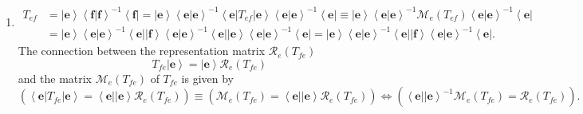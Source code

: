 \documentclass[aps,preprint]{revtex4}%
\begin{document}
\begin{enumerate}
\item
\begin{align}
T_{ef}  &  =\left\vert \mathbf{e}\right\rangle \left\langle \left.
\mathbf{f}\right\vert \mathbf{f}\right\rangle ^{-1}\left\langle \mathbf{f}%
\right\vert =\left\vert \mathbf{e}\right\rangle \left\langle \left.
\mathbf{e}\right\vert \mathbf{e}\right\rangle ^{-1}\left\langle \mathbf{e}%
\right\vert T_{ef}\left\vert \mathbf{e}\right\rangle \left\langle \left.
\mathbf{e}\right\vert \mathbf{e}\right\rangle ^{-1}\left\langle \mathbf{e}%
\right\vert \equiv\left\vert \mathbf{e}\right\rangle \left\langle \left.
\mathbf{e}\right\vert \mathbf{e}\right\rangle ^{-1}\mathcal{M}_{e}\left(
T_{ef}\right)  \left\langle \left.  \mathbf{e}\right\vert \mathbf{e}%
\right\rangle ^{-1}\left\langle \mathbf{e}\right\vert \\
&  =\left\vert \mathbf{e}\right\rangle \left\langle \left.  \mathbf{e}%
\right\vert \mathbf{e}\right\rangle ^{-1}\left\langle \mathbf{e}\right\vert
\left\vert \mathbf{f}\right\rangle \left\langle \left.  \mathbf{e}\right\vert
\mathbf{e}\right\rangle ^{-1}\left\langle \mathbf{e}\right\vert \left\vert
\mathbf{e}\right\rangle \left\langle \left.  \mathbf{e}\right\vert
\mathbf{e}\right\rangle ^{-1}\left\langle \mathbf{e}\right\vert =\left\vert
\mathbf{e}\right\rangle \left\langle \left.  \mathbf{e}\right\vert
\mathbf{e}\right\rangle ^{-1}\left\langle \mathbf{e}\right\vert \left\vert
\mathbf{f}\right\rangle \left\langle \left.  \mathbf{e}\right\vert
\mathbf{e}\right\rangle ^{-1}\left\langle \mathbf{e}\right\vert .
\end{align}
The connection between the representation matrix $\mathcal{R}_{e}\left(
T_{fe}\right)  $%
\begin{equation}
T_{fe}\left\vert \mathbf{e}\right\rangle =\left\vert \mathbf{e}\right\rangle
\mathcal{R}_{e}\left(  T_{fe}\right)
\end{equation}
and the matrix $\mathcal{M}_{e}\left(  T_{fe}\right)  $ of $T_{fe}$ is given
by
\begin{equation}
\left(  \overset{}{\left\langle \mathbf{e}\right\vert T_{fe}\left\vert
\mathbf{e}\right\rangle =\left\langle \mathbf{e}\right\vert \left\vert
\mathbf{e}\right\rangle \mathcal{R}_{e}\left(  T_{fe}\right)  }\right)
\equiv\left(  \overset{}{\mathcal{M}_{e}\left(  T_{fe}\right)  =\left\langle
\mathbf{e}\right\vert \left\vert \mathbf{e}\right\rangle \mathcal{R}%
_{e}\left(  T_{fe}\right)  }\right)  \Longleftrightarrow\left(
\overset{}{\left\langle \mathbf{e}\right\vert \left\vert \mathbf{e}%
\right\rangle ^{-1}\mathcal{M}_{e}\left(  T_{fe}\right)  =\mathcal{R}%
_{e}\left(  T_{fe}\right)  }\right)  .
\end{equation}

\end{enumerate}
\end{document}
